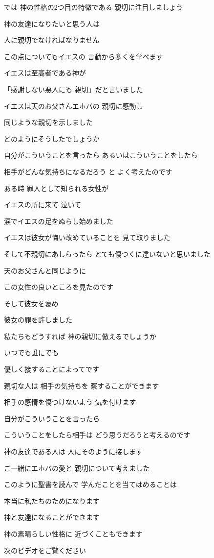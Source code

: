 \documentclass[twocolumn]{jsarticle}
\begin{document}
では 神の性格の2つ目の特徴である
親切に注目しましょう

神の友達になりたいと思う人は

人に親切でなければなりません

この点についてもイエスの
言動から多くを学べます

イエスは至高者である神が

「感謝しない悪人にも
親切」だと言いました

イエスは天のお父さんエホバの
親切に感動し

同じような親切を示しました

どのようにそうしたでしょうか

自分がこういうことを言ったら
あるいはこういうことをしたら

相手がどんな気持ちになるだろう と
よく考えたのです

ある時 罪人として知られる女性が

イエスの所に来て 泣いて

涙でイエスの足をぬらし始めました

イエスは彼女が悔い改めていることを
見て取りました

そして不親切にあしらったら
とても傷つくに違いないと思いました

天のお父さんと同じように

この女性の良いところを見たのです

そして彼女を褒め

彼女の罪を許しました

私たちもどうすれば
神の親切に倣えるでしょうか

いつでも誰にでも

優しく接することによってです

親切な人は 相手の気持ちを
察することができます

相手の感情を傷つけないよう
気を付けます

自分がこういうことを言ったら

こういうことをしたら相手は
どう思うだろうと考えるのです

神の友達である人は
人にそのように接します

ご一緒にエホバの愛と
親切について考えました

このように聖書を読んで
学んだことを当てはめることは

本当に私たちのためになります

神と友達になることができます

神の素晴らしい性格に
近づくこともできます

次のビデオをご覧ください
\end{document}
